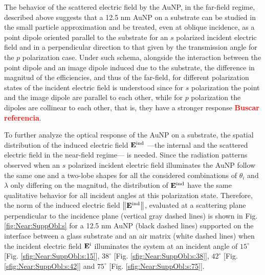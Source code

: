 The behavior of the scattered electric field by the AuNP, in the far-field regime, described above suggests that a 12.5 nm AuNP on a substrate can be studied in the small particle approximation and be treated, even at oblique incidence, as a point dipole oriented  parallel to the substrate for an $s$ polarized incident electric field and in a perpendicular direction to that given by the transmission angle for the $p$ polarization case. Under such schema, alongside the interaction between the point dipole and an image dipole induced due to the substrate, the difference in magnitud of the efficiencies, and thus of the far-field, for different polarization states of the incident electric field  is understood since for $s$ polarization the point and the image dipole are parallel to each other, while for  $p$ polarization the dipoles are collinear to each other, that is, they have a stronger response \textcolor{red}{\bf Buscar referencia}.

To further analyze the optical response of the AuNP on a substrate, the spatial distribution of the induced electric field $\vb{E}^\text{ind}$ ---the internal and the scattered electric field in the near-field regime--- is needed. Since the radiation patterns observed when an $s$ polarized incident electric field illuminates the AuNP follow the same one and a two-lobe shapes for all the considered combinations of $\theta_i$ and $\lambda$ only differing on the magnitud, the distribution of $\vb{E}^\text{ind}$  have the same qualitative behavior for all incident angles at this polarization state. Therefore, the norm of the induced electric field $\norm{\vb{E}^\text{ind}}$, evaluated at a scattering plane perpendicular to the incidence plane (vertical gray dashed lines) is shown in Fig. \ref{fig:Near:SuppObl:s} for a 12.5 nm AuNP (black dashed lines) supported on the interface between a glass substrate and an air matrix (white dashed lines) when the incident electric field $\vb{E}^\text{i}$ illuminates the system at an incident angle of $15^\circ$ [Fig. \ref{sfig:Near:SuppObl:s:15}], $38^\circ$ [Fig. \ref{sfig:Near:SuppObl:s:38}], $42^\circ$ [Fig. \ref{sfig:Near:SuppObl:s:42}]  and $75^\circ$ [Fig. \ref{sfig:Near:SuppObl:s:75}].

